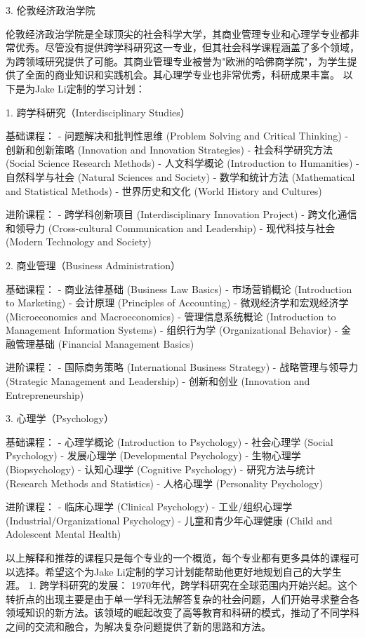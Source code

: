 \documentclass{extarticle}
\begin{document}
\begin{CJK*}{UTF8}{gbsn}
3. 伦敦经济政治学院

伦敦经济政治学院是全球顶尖的社会科学大学，其商业管理专业和心理学专业都非常优秀。尽管没有提供跨学科研究这一专业，但其社会科学课程涵盖了多个领域，为跨领域研究提供了可能。其商业管理专业被誉为"欧洲的哈佛商学院"，为学生提供了全面的商业知识和实践机会。其心理学专业也非常优秀，科研成果丰富。
以下是为Jake Li定制的学习计划：

1. 跨学科研究（Interdisciplinary Studies）

基础课程：
- 问题解决和批判性思维 (Problem Solving and Critical Thinking)
- 创新和创新策略 (Innovation and Innovation Strategies)
- 社会科学研究方法 (Social Science Research Methods)
- 人文科学概论 (Introduction to Humanities)
- 自然科学与社会 (Natural Sciences and Society)
- 数学和统计方法 (Mathematical and Statistical Methods)
- 世界历史和文化 (World History and Cultures)

进阶课程：
- 跨学科创新项目 (Interdisciplinary Innovation Project)
- 跨文化通信和领导力 (Cross-cultural Communication and Leadership)
- 现代科技与社会 (Modern Technology and Society)

2. 商业管理（Business Administration）

基础课程：
- 商业法律基础 (Business Law Basics)
- 市场营销概论 (Introduction to Marketing)
- 会计原理 (Principles of Accounting)
- 微观经济学和宏观经济学 (Microeconomics and Macroeconomics)
- 管理信息系统概论 (Introduction to Management Information Systems)
- 组织行为学 (Organizational Behavior)
- 金融管理基础 (Financial Management Basics)

进阶课程：
- 国际商务策略 (International Business Strategy)
- 战略管理与领导力 (Strategic Management and Leadership)
- 创新和创业 (Innovation and Entrepreneurship)

3. 心理学（Psychology）

基础课程：
- 心理学概论 (Introduction to Psychology)
- 社会心理学 (Social Psychology)
- 发展心理学 (Developmental Psychology)
- 生物心理学 (Biopsychology)
- 认知心理学 (Cognitive Psychology)
- 研究方法与统计 (Research Methods and Statistics)
- 人格心理学 (Personality Psychology)

进阶课程：
- 临床心理学 (Clinical Psychology)
- 工业/组织心理学 (Industrial/Organizational Psychology)
- 儿童和青少年心理健康 (Child and Adolescent Mental Health)

以上解释和推荐的课程只是每个专业的一个概览，每个专业都有更多具体的课程可以选择。希望这个为Jake Li定制的学习计划能帮助他更好地规划自己的大学生涯。
1. 跨学科研究的发展：
1970年代，跨学科研究在全球范围内开始兴起。这个转折点的出现主要是由于单一学科无法解答复杂的社会问题，人们开始寻求整合各领域知识的新方法。该领域的崛起改变了高等教育和科研的模式，推动了不同学科之间的交流和融合，为解决复杂问题提供了新的思路和方法。


\end{CJK*}
\end{document}
